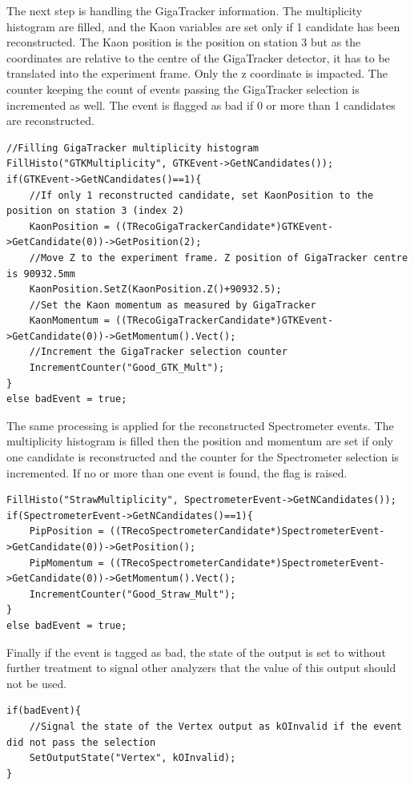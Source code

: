 The next step is handling the GigaTracker information. The multiplicity histogram are filled,
and the Kaon variables are set only if 1 candidate has been reconstructed. The Kaon position is the
position on station 3 but as the coordinates are relative to the centre of the GigaTracker
detector, it has to be translated into the experiment frame. Only the z coordinate is impacted.
The counter keeping the count of events passing the GigaTracker selection is incremented as well.
The event is flagged as bad if 0 or more than 1 candidates are reconstructed.

\begin{lstlisting}
//Filling GigaTracker multiplicity histogram
FillHisto("GTKMultiplicity", GTKEvent->GetNCandidates());
if(GTKEvent->GetNCandidates()==1){
	//If only 1 reconstructed candidate, set KaonPosition to the position on station 3 (index 2)
	KaonPosition = ((TRecoGigaTrackerCandidate*)GTKEvent->GetCandidate(0))->GetPosition(2);
	//Move Z to the experiment frame. Z position of GigaTracker centre is 90932.5mm  
	KaonPosition.SetZ(KaonPosition.Z()+90932.5);
	//Set the Kaon momentum as measured by GigaTracker
	KaonMomentum = ((TRecoGigaTrackerCandidate*)GTKEvent->GetCandidate(0))->GetMomentum().Vect();
	//Increment the GigaTracker selection counter
	IncrementCounter("Good_GTK_Mult");
}
else badEvent = true;
\end{lstlisting}

The same processing is applied for the reconstructed Spectrometer events. The multiplicity 
histogram is filled then the position and momentum are set if only one candidate is reconstructed
and the counter for the Spectrometer selection is incremented. If no or more than one event is
found, the  flag is raised.

\begin{lstlisting}
FillHisto("StrawMultiplicity", SpectrometerEvent->GetNCandidates());
if(SpectrometerEvent->GetNCandidates()==1){
	PipPosition = ((TRecoSpectrometerCandidate*)SpectrometerEvent->GetCandidate(0))->GetPosition();
	PipMomentum = ((TRecoSpectrometerCandidate*)SpectrometerEvent->GetCandidate(0))->GetMomentum().Vect();
	IncrementCounter("Good_Straw_Mult");
}
else badEvent = true;
\end{lstlisting}

Finally if the event is tagged as bad, the state of the output is set to  without
further treatment to signal other analyzers that the value of this output should not be used. 

\begin{lstlisting}
if(badEvent){
	//Signal the state of the Vertex output as kOInvalid if the event did not pass the selection
	SetOutputState("Vertex", kOInvalid);
}
\end{lstlisting}


